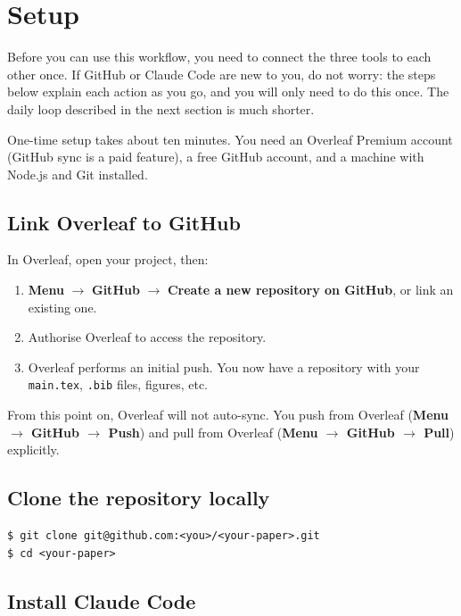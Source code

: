 \section{Setup}
\label{sec:setup}

Before you can use this workflow, you need to connect the three tools to each other once. If GitHub or Claude Code are new to you, do not worry: the steps below explain each action as you go, and you will only need to do this once. The daily loop described in the next section is much shorter.

One-time setup takes about ten minutes. You need an Overleaf Premium account (GitHub sync is a paid feature), a free GitHub account, and a machine with Node.js and Git installed.

\subsection{Link Overleaf to GitHub}

In Overleaf, open your project, then:

\begin{enumerate}[leftmargin=*]
  \item \textbf{Menu} $\rightarrow$ \textbf{GitHub} $\rightarrow$ \textbf{Create a new repository on GitHub}, or link an existing one.
  \item Authorise Overleaf to access the repository.
  \item Overleaf performs an initial push. You now have a repository with your \verb|main.tex|, \verb|.bib| files, figures, etc.
\end{enumerate}

From this point on, Overleaf will not auto-sync. You push from Overleaf (\textbf{Menu $\rightarrow$ GitHub $\rightarrow$ Push}) and pull from Overleaf (\textbf{Menu $\rightarrow$ GitHub $\rightarrow$ Pull}) explicitly.

\subsection{Clone the repository locally}

\begin{lstlisting}[style=shell]
$ git clone git@github.com:<you>/<your-paper>.git
$ cd <your-paper>
\end{lstlisting}

\subsection{Install Claude Code}

